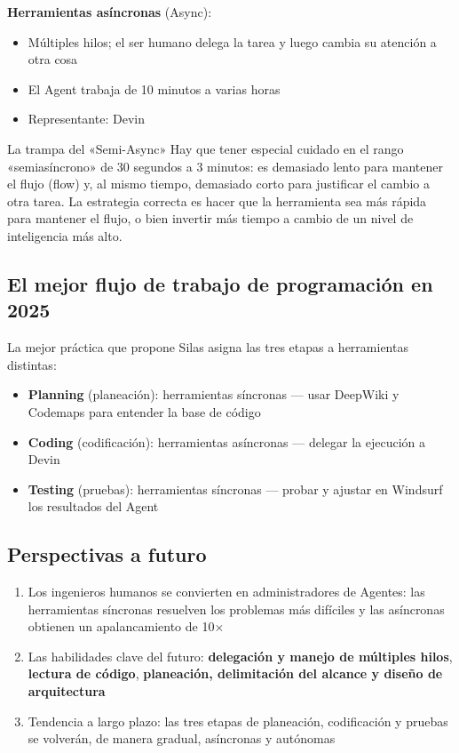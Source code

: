 \textbf{Herramientas asíncronas} (Async):
\begin{itemize}
    \item Múltiples hilos; el ser humano delega la tarea y luego cambia su atención a otra cosa
    \item El Agent trabaja de 10 minutos a varias horas
    \item Representante: Devin
\end{itemize}

\begin{warningbox}{La trampa del «Semi-Async»}
Hay que tener especial cuidado en el rango «semiasíncrono» de 30 segundos a 3 minutos: es demasiado lento para mantener el flujo (flow) y, al mismo tiempo, demasiado corto para justificar el cambio a otra tarea. La estrategia correcta es hacer que la herramienta sea más rápida para mantener el flujo, o bien invertir más tiempo a cambio de un nivel de inteligencia más alto.
\end{warningbox}

\subsection{El mejor flujo de trabajo de programación en 2025}

La mejor práctica que propone Silas asigna las tres etapas a herramientas distintas:

\begin{itemize}
    \item \textbf{Planning} (planeación): herramientas síncronas — usar DeepWiki y Codemaps para entender la base de código
    \item \textbf{Coding} (codificación): herramientas asíncronas — delegar la ejecución a Devin
    \item \textbf{Testing} (pruebas): herramientas síncronas — probar y ajustar en Windsurf los resultados del Agent
\end{itemize}

\subsection{Perspectivas a futuro}

\begin{enumerate}
    \item Los ingenieros humanos se convierten en administradores de Agentes: las herramientas síncronas resuelven los problemas más difíciles y las asíncronas obtienen un apalancamiento de 10$\times$
    \item Las habilidades clave del futuro: \textbf{delegación y manejo de múltiples hilos}, \textbf{lectura de código}, \textbf{planeación, delimitación del alcance y diseño de arquitectura}
    \item Tendencia a largo plazo: las tres etapas de planeación, codificación y pruebas se volverán, de manera gradual, asíncronas y autónomas
\end{enumerate}


